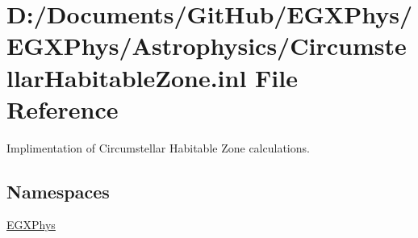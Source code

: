 \hypertarget{_circumstellar_habitable_zone_8inl}{}\section{D\+:/\+Documents/\+Git\+Hub/\+E\+G\+X\+Phys/\+E\+G\+X\+Phys/\+Astrophysics/\+Circumstellar\+Habitable\+Zone.inl File Reference}
\label{_circumstellar_habitable_zone_8inl}


Implimentation of Circumstellar Habitable Zone calculations.  


\subsection*{Namespaces}
\begin{DoxyCompactItemize}
\item 
 \hyperlink{namespace_e_g_x_phys}{E\+G\+X\+Phys}
\end{DoxyCompactItemize}
